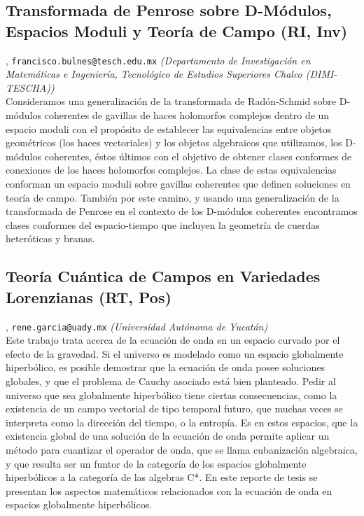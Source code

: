 \subsection{\sffamily Transformada de Penrose sobre D-M\'odulos, Espacios Moduli y Teor\'ia de Campo {\footnotesize (RI, Inv)}} \label{reg-308} 
, {\tt francisco.bulnes@tesch.edu.mx}  {\slshape (Departamento de Investigaci\'on en Matem\'aticas e Ingenier\'ia, Tecnol\'ogico de Estudios Superiores Chalco (DIMI-TESCHA))}\\
          \noindent  Consideramos una generalizaci\'on de la transformada de Rad\'on-Schmid sobre D-m\'odulos coherentes de gavillas de haces holomorfos complejos dentro de un espacio moduli con el prop\'osito de establecer las equivalencias entre objetos geom\'etricos (los haces vectoriales) y los objetos algebraicos que utilizamos, los D-m\'odulos coherentes, \'estos \'ultimos con el objetivo de obtener clases conformes de conexiones de los haces holomorfos complejos. La clase de estas equivalencias conforman un espacio moduli sobre gavillas coherentes que definen soluciones en teor\'ia de campo. Tambi\'en por este camino, y usando una generalizaci\'on de la transformada de Penrose en el contexto de los D-m\'odulos coherentes encontramos clases conformes del espacio-tiempo que incluyen la geometr\'ia de cuerdas heter\'oticas y branas.
\subsection{\sffamily Teor\'ia Cu\'antica de Campos en Variedades Lorenzianas {\footnotesize (RT, Pos)}} \label{reg-403} 
, {\tt rene.garcia@uady.mx}  {\slshape (Universidad Aut\'onoma de Yucat\'an)}\\
          \noindent Este trabajo trata acerca de la ecuaci\'on de onda en un espacio curvado por el efecto de la gravedad. Si el universo es modelado como un espacio globalmente hiperb\'olico, es posible demostrar que la ecuaci\'on de onda posee soluciones globales, y que el problema de Cauchy asociado est\'a bien planteado. Pedir al universo que sea globalmente hiperb\'olico tiene ciertas consecuencias, como la existencia de un campo vectorial de tipo temporal futuro, que muchas veces se interpreta como la direcci\'on del tiempo, o la entrop\'ia. Es en estos espacios, que la existencia global de una soluci\'on de la ecuaci\'on de onda permite aplicar un m\'etodo para cuantizar el operador de onda, que se llama cubanizaci\'on algebraica, y que resulta ser un funtor de la categor\'ia de los espacios globalmente hiperb\'olicos a la categor\'ia de las algebras C*. En este reporte de tesis se presentan los aspectos matem\'aticos relacionados con la ecuaci\'on de onda en espacios globalmente hiperb\'olicos.
